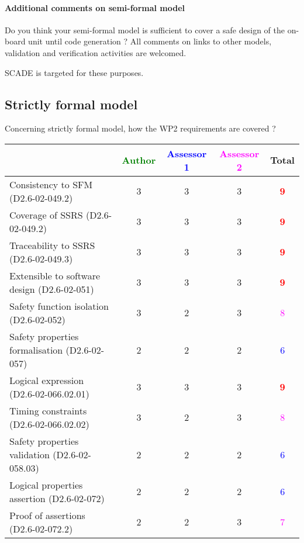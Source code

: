 \paragraph{Additional comments on semi-formal  model} Do you think your semi-formal  model is sufficient to cover a safe design of the on-board unit until code generation ?
All comments on links to  other models, validation and verification activities are welcomed.

\begin{author_comment}
SCADE is targeted for these purposes.   
\end{author_comment}


\subsection{Strictly formal model}

Concerning strictly formal model, how the WP2 requirements are covered ?

\begin{tabular}{|l | c | c | c | c|}
\hline
& \textcolor{green}{Author} & \textcolor{blue}{Assessor 1} & \textcolor{magenta}{Assessor 2} & Total \\
\hline 
Consistency to SFM (D2.6-02-049.2) & 3     & 3     &3 & \textcolor{red}{\textbf{9}} \\
\hline
Coverage of SSRS (D2.6-02-049.2)  &3 & 3     &3 &  \textcolor{red}{\textbf{9}}  \\
\hline
Traceability to  SSRS (D2.6-02-049.3)  &3 & 3     &3 & \textcolor{red}{\textbf{9}}  \\
\hline
Extensible to software design (D2.6-02-051)  &3 & 3     &3 & \textcolor{red}{\textbf{9}}  \\
\hline
Safety function isolation (D2.6-02-052)  &  3& 2     &3 & \textcolor{magenta}{8}  \\
\hline 
Safety properties formalisation (D2.6-02-057)  &  2&
2&2 & \textcolor{blue}{6}  \\
\hline
Logical expression (D2.6-02-066.02.01)  &  3&3 &3 & \textcolor{red}{\textbf{9}}  \\
\hline
Timing constraints (D2.6-02-066.02.02)  &  3&2 &3 & \textcolor{magenta}{8} \\
\hline
Safety properties validation (D2.6-02-058.03)  &  2& 2     &2 & \textcolor{blue}{6}  \\
\hline
Logical properties assertion (D2.6-02-072)  &  2& 2     &2 & \textcolor{blue}{6} \\
\hline
Proof of assertions (D2.6-02-072.2)  &  2 & 2     &3 & \textcolor{magenta}{7} \\
\hline
\end{tabular}

